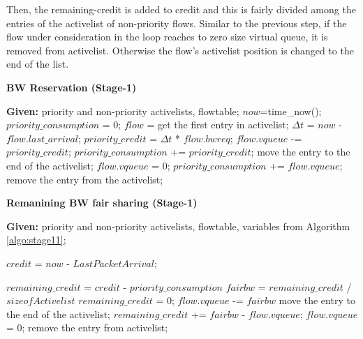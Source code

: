\documentclass[10pt,sigconf,letterpaper,anonymous]{acmart}
\begin{document}
Then, the remaining-credit is added to credit and this is fairly divided among the entries of the activelist of non-priority flows. Similar to the previous step, if the flow under consideration in the loop reaches to zero size virtual queue, it is removed from activelist. Otherwise the flow's activelist position is changed to the end of the list.

\begin{algorithm}
\caption{\textbf{BW Reservation (Stage-1)}}
\label {algo:stage11}
\begin{algorithmic}[1]
\STATE \textbf{Given:} priority and non-priority activelists, flowtable;
\STATE $now$=time\_now();
\STATE $priority\_consumption$ = 0;
\STATE $flow$ = get the first entry in activelist;
\STATE $\Delta t$ = $now$ - $flow.last\_arrival$;
\STATE $priority\_credit$ = $\Delta t$ * $flow.bwreq$;
\STATE $flow.vqueue$ -= $priority\_credit$;
\STATE $priority\_consumption$ += $priority\_credit$;
\STATE move the entry to the end of the activelist;
\ELSE 
\STATE $flow.vqueue$ = 0;
\STATE $priority\_consumption$ += $flow.vqueue$;
\STATE remove the entry from the activelist;
\ENDIF
\ENDFOR
\ENDIF
\end{algorithmic}
\end{algorithm}

\begin{algorithm}
\caption{\textbf{Remanining BW fair sharing (Stage-1)}}
\label {algo:stage12}
\begin{algorithmic}[1]
\STATE \textbf{Given:} priority and non-priority activelists, flowtable, variables from Algorithm \ref{algo:stage11};

\STATE $credit$ = $now$ - $Last Packet Arrival$;

\STATE $remaining\_credit$ = $credit$ - $priority\_consumption$
\STATE $fairbw$ = $remaining\_credit$ / $sizeofActivelist$
\STATE $remaining\_credit$ = 0;
\STATE $flow.vqueue$ -= $fairbw$
\STATE move the entry to the end of the activelist;
\ELSE
\STATE $remaining\_credit$ += $fairbw$ - $flow.vqueue$;
\STATE $flow.vqueue$ = 0;
\STATE remove the entry from activelist;
\ENDIF
\ENDFOR
\ENDWHILE
\ENDIF

\end{algorithmic}
\end{algorithm}
\end{document}
